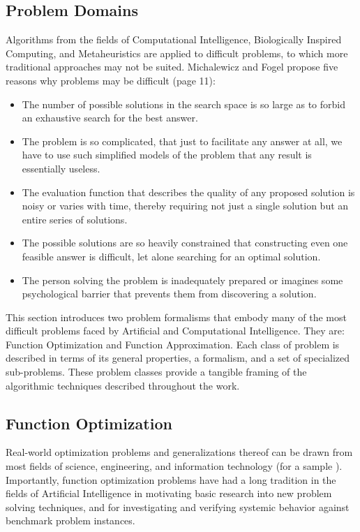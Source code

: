 \begin{bibunit}
\section{Problem Domains}
\label{sec:problems}
Algorithms from the fields of Computational Intelligence, Biologically Inspired Computing, and Metaheuristics are applied to difficult problems, to which more traditional approaches may not be suited.
Michalewicz and Fogel propose five reasons why problems may be difficult \cite{Michalewicz2004} (page 11):
\begin{itemize}
	\item The number of possible solutions in the search space is so large as to forbid an exhaustive search for the best answer.
	\item The problem is so complicated, that just to facilitate any answer at all, we have to use such simplified models of the problem that any result is essentially useless.
	\item The evaluation function that describes the quality of any proposed solution is noisy or varies with time, thereby requiring not just a single solution but an entire series of solutions.
	\item The possible solutions are so heavily constrained that constructing even one feasible answer is difficult, let alone searching for an optimal solution.
	\item The person solving the problem is inadequately prepared or imagines some psychological barrier that prevents them from discovering a solution.
\end{itemize}

This section introduces two problem formalisms that embody many of the most difficult problems faced by Artificial and Computational Intelligence. They are: Function Optimization and Function Approximation. Each class of problem is described in terms of its general properties, a formalism, and a set of specialized sub-problems. These problem classes provide a tangible framing of the algorithmic techniques described throughout the work.

% 
%
\subsection{Function Optimization}
\label{subsec:function_optimization}
Real-world optimization problems and generalizations thereof can be drawn from most fields of science, engineering, and information technology (for a sample \cite{Ali1997, Toern1999}). Importantly, function optimization problems have had a long tradition in the fields of Artificial Intelligence in motivating basic research into new problem solving techniques, and for investigating and verifying systemic behavior against benchmark problem instances.


\end{bibunit}
